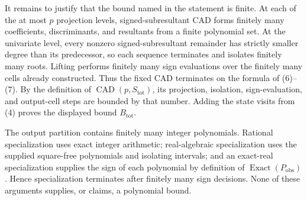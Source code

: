 It remains to justify that the bound named in the statement is finite. At each of the at most \(p\) projection levels, signed-subresultant CAD forms finitely many coefficients, discriminants, and resultants from a finite polynomial set. At the univariate level, every nonzero signed-subresultant remainder has strictly smaller degree than its predecessor, so each sequence terminates and isolates finitely many roots. Lifting performs finitely many sign evaluations over the finitely many cells already constructed. Thus the fixed CAD terminates on the formula of (6)--(7). By the definition of \(\operatorname{CAD}(p,S_{\mathrm{tot}})\), its projection, isolation, sign-evaluation, and output-cell steps are bounded by that number. Adding the state visits from (4) proves the displayed bound \(B_{\mathrm{tot}}\).

The output partition contains finitely many integer polynomials. Rational specialization uses exact integer arithmetic; real-algebraic specialization uses the supplied square-free polynomials and isolating intervals; and an exact-real specialization supplies the sign of each polynomial by definition of \(\operatorname{Exact}(P_{\mathrm{obs}})\). Hence specialization terminates after finitely many sign decisions. None of these arguments supplies, or claims, a polynomial bound.